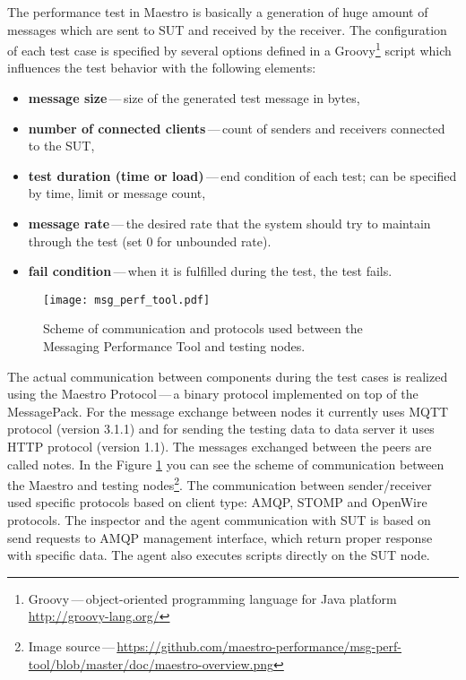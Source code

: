 \documentclass{ExcelAtFIT}
\begin{document}
The performance test in Maestro is basically a generation of huge amount of messages which are sent to SUT and received by the receiver. The configuration of each test case is specified by several options defined in a Groovy\footnote{Groovy\,---\,object-oriented programming language for Java platform \url{http://groovy-lang.org/}} script which influences the test behavior with the following elements:
\begin{itemize}
	\item \textbf{message size}\,---\,size of the generated test message in bytes,
	\item \textbf{number of connected clients}\,---\,count of senders and receivers connected to the SUT,
	\item \textbf{test duration (time or load)}\,---\,end condition of each test; can be specified by time, limit or message count,
	\item \textbf{message rate}\,---\,the desired rate that the system should try to maintain through the test (set 0 for unbounded rate).
	\item \textbf{fail condition}\,---\,when it is fulfilled during the test, the test fails.
\end{itemize}

\begin{figure}[h]
	\centering
	\texttt{[image: msg\_perf\_tool.pdf]}
	\caption{Scheme of communication and protocols used between the Messaging Performance Tool and testing nodes.}
	\label{fig:maestro}
\end{figure}

The actual communication between components during the test cases is realized using the Maestro Protocol\,---\,a binary protocol implemented on top of the MessagePack\footnotemark{}. For the message exchange between nodes it currently uses MQTT protocol (version 3.1.1) and for sending the testing data to data server it uses HTTP protocol (version 1.1). The messages exchanged between the peers are called notes. In the Figure \ref{fig:maestro} you can see the scheme of communication between the Maestro and testing nodes\footnote{Image source\,---\,\url{https://github.com/maestro-performance/msg-perf-tool/blob/master/doc/maestro-overview.png}}. The communication between sender/receiver used specific protocols based on client type: AMQP, STOMP and OpenWire protocols. The inspector and the agent communication with SUT is based on send requests to AMQP management interface, which return proper response with specific data. The agent also executes scripts directly on the SUT node.
\end{document}
